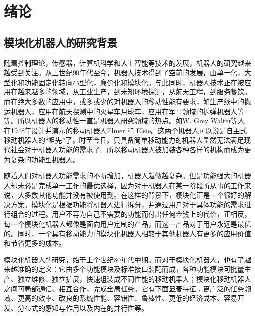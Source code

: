 
\chapter{绪论}
\label{chap:introduction}

\section{模块化机器人的研究背景}

随着控制理论，传感器，计算机科学和人工智能等技术的发展，机器人的研究越来越受到关注。从上世纪90年代至今，机器人技术得到了空前的发展，由单一化，大型化和功能固定化转向小型化，廉价化和模块化。与此同时，机器人技术正在被应用在越来越多的领域，从工业生产，到未知环境探测，从航天工程，到服务餐饮。而在绝大多数的应用中，或多或少的对机器人的移动性能有要求，如生产线中的搬运机器人，应用在航天探测中的火星车月球车，应用在军事领域的拆弹机器人等等。所以机器人的移动性一直是机器人研究领域的热点。如W. Grey Walter等人在1948年设计并演示的移动机器人Elmer 和 Elsie。这两个机器人可以说是自主式移动机器人的“祖先”了。时至今日，只具备简单移动能力的机器人显然无法满足现代社会对于机器人功能的需求了。所以移动机器人被加装各种各样的机构而成为更为复杂的功能型机器人。

随着人们对机器人功能需求的不断增加，机器人越做越复杂。但是功能强大的机器人却未必是完成单一工作的最优选择，因为对于机器人在某一阶段所从事的工作来说，大多数其他功能并没有被使用到。在这样的背景下，模块化正是一个很好的解决方案。模块化是根据功能将机器人进行拆分，并通过用户对于具体功能的需求进行组合的过程。用户不再为自己不需要的功能而付出任何金钱上的代价，正相反，每一个模块化机器人都像是面向用户定制的产品，而这一产品对于用户永远是最优的。同时，一个具有移动能力的模块化机器人相较于其他机器人有更多的应用价值和节省更多的成本。 

模块化机器人的研究，始于上个世纪80年代中期。而对于模块化机器人，也有了越来越准确的定义：它由多个功能模块及标准接口装配而成，各种功能模块可批量生产、独立维修、独立扩展，快速组装成不同性能的移动机器人；模块化移动机器人之间可局部通信、相互合作，完成全局任务。它有下面显著特征：更广泛的任务领域、更高的效率、改良的系统性能、容错性、鲁棒性、更低的经济成本、容易开发、分布式的感知与作用以及内在的并行性等。 

